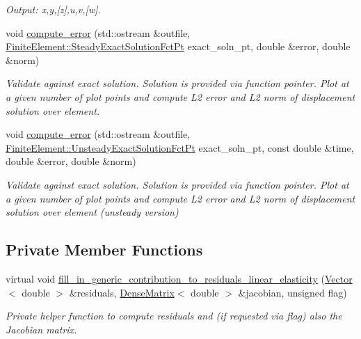 \begin{DoxyCompactItemize}
\begin{DoxyCompactList}\small\item\em Output\+: x,y,\mbox{[}z\mbox{]},u,v,\mbox{[}w\mbox{]}. \end{DoxyCompactList}\item 
void \hyperlink{classoomph_1_1LinearElasticityEquations_a225d149a4b093cd4688fa644c29b75c8}{compute\+\_\+error} (std\+::ostream \&outfile, \hyperlink{classoomph_1_1FiniteElement_a690fd33af26cc3e84f39bba6d5a85202}{Finite\+Element\+::\+Steady\+Exact\+Solution\+Fct\+Pt} exact\+\_\+soln\+\_\+pt, double \&error, double \&norm)
\begin{DoxyCompactList}\small\item\em Validate against exact solution. Solution is provided via function pointer. Plot at a given number of plot points and compute L2 error and L2 norm of displacement solution over element. \end{DoxyCompactList}\item 
void \hyperlink{classoomph_1_1LinearElasticityEquations_a8970a7a9633571974d8769717a3acc19}{compute\+\_\+error} (std\+::ostream \&outfile, \hyperlink{classoomph_1_1FiniteElement_ad4ecf2b61b158a4b4d351a60d23c633e}{Finite\+Element\+::\+Unsteady\+Exact\+Solution\+Fct\+Pt} exact\+\_\+soln\+\_\+pt, const double \&time, double \&error, double \&norm)
\begin{DoxyCompactList}\small\item\em Validate against exact solution. Solution is provided via function pointer. Plot at a given number of plot points and compute L2 error and L2 norm of displacement solution over element (unsteady version) \end{DoxyCompactList}\end{DoxyCompactItemize}
\subsection*{Private Member Functions}
\begin{DoxyCompactItemize}
\item 
virtual void \hyperlink{classoomph_1_1LinearElasticityEquations_aac93dfe3be4fd6debf914a787e87727d}{fill\+\_\+in\+\_\+generic\+\_\+contribution\+\_\+to\+\_\+residuals\+\_\+linear\+\_\+elasticity} (\hyperlink{classoomph_1_1Vector}{Vector}$<$ double $>$ \&residuals, \hyperlink{classoomph_1_1DenseMatrix}{Dense\+Matrix}$<$ double $>$ \&jacobian, unsigned flag)
\begin{DoxyCompactList}\small\item\em Private helper function to compute residuals and (if requested via flag) also the Jacobian matrix. \end{DoxyCompactList}\end{DoxyCompactItemize}
